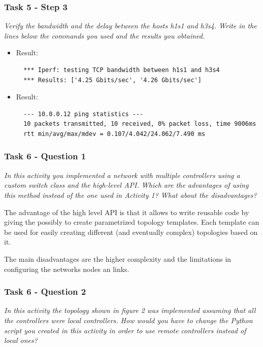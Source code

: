 \subsubsection*{Task 5 - Step 3}
\textit{Verify the bandwidth and the delay between the hosts h1s1 and h3s4. Write
in the lines below the commands you used and the results you obtained.}
\begin{itemize}
  \item {}

  Result:
  \begin{lstlisting}
  *** Iperf: testing TCP bandwidth between h1s1 and h3s4
  *** Results: ['4.25 Gbits/sec', '4.26 Gbits/sec']
  \end{lstlisting}

  \item {}

  Result:
  \begin{lstlisting}
  --- 10.0.0.12 ping statistics ---
  10 packets transmitted, 10 received, 0% packet loss, time 9006ms
  rtt min/avg/max/mdev = 0.107/4.042/24.062/7.490 ms
  \end{lstlisting}
\end{itemize}




\subsubsection*{Task 6 - Question 1}
\textit{In this activity you implemented a network with multiple controllers using
a custom switch class and the high-level API. Which are the advantages of using
this method instead of the one used in Activity 1? What about the disadvantages?}

The advantage of the high level API is that it allows to write reusable code by
giving the possibly to create parametrized topology templates. Each template can
be used for easily creating different (and eventually complex) topologies based on it.

The main disadvantages are the higher complexity and the limitations in configuring
the networks nodes an links.
\subsubsection*{Task 6 - Question 2}
\textit{In this activity the topology shown in figure 2 was implemented
assuming that all the controllers were local controllers. How would
you have to change the Python script you created in this activity
in order to use remote controllers instead of local ones?}

